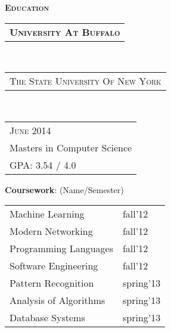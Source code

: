 \documentclass[10pt,a4paper,oneside]{article}
\begin{document}
    \hspace{2ex}
    \begin{minipage}[t]{0.33\textwidth}
        \vspace{0pt}
        \textcolor{light-gray}{\textbf{\large E\textsc{ducation}}}
        \vspace{10pt}\\
        \begin{tabular}{c}
            \textbf{\normalsize U\textsc{niversity} A\textsc{t} B\textsc{uffalo}}
        \end{tabular}\\
        \textcolor{light-gray}{
            \begin{tabular}{l}
                {\small T\textsc{he} S\textsc{tate} U\textsc{niversity} O\textsc{f} N\textsc{ew} Y\textsc{ork}}
            \end{tabular}
        }\\ 
        \begin{tabular}{l}
            {\small J\textsc{une} 2014}\\
            {\small Masters in Computer Science }\\
            {\small GPA: 3.54 / 4.0}
        \end{tabular}
        \vspace{0pt}
        \begin{adjustwidth}{7pt}{0pt}
            {\small \textbf{Coursework}: (Name/Semester)}\\
        \end{adjustwidth}
        \vspace{-11pt}
        \begin{adjustwidth}{7pt}{0pt}
            \begin{tabular}{ll}
                { \footnotesize Machine Learning } & {\footnotesize fall'12}\\                
                { \footnotesize Modern Networking } & {\footnotesize fall'12}\\
                { \footnotesize Programming Languages } & {\footnotesize fall'12}\\
                { \footnotesize Software Engineering } & {\footnotesize fall'12}\\
                { \footnotesize Pattern Recognition } & {\footnotesize spring'13}\\
                { \footnotesize Analysis of Algorithms } & {\footnotesize spring'13}\\
                { \footnotesize Database Systems } & {\footnotesize spring'13}\\

\end{tabular}
\end{adjustwidth}
\end{minipage}
\end{document}
